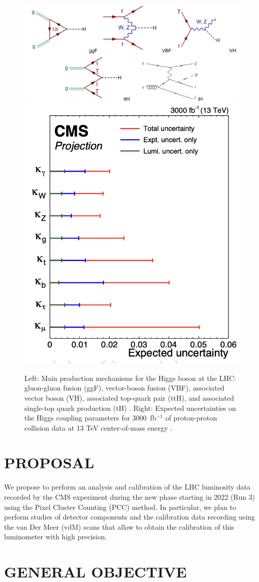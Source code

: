 \documentclass[final,12pt]{article}
\newcommand{\lumi}[1]{{#1~fb$^{-1}$}}
\begin{document}
 \begin{figure}[H]
   \centering
   \includegraphics[width=0.7\columnwidth]{./pg.png}
   \includegraphics[width=0.29\columnwidth]{./higgs_couplings.png}
   \caption{
     Left: Main production mechanisms for the Higgs boson at the LHC: gluon-gluon fusion (ggF), vector-boson fusion (VBF), associated vector boson (VH), associated top-quark pair (ttH), and  associated single-top quark production (tH)  \cite{Grojean:2017hsb-corr}  \cite{Khachatryan:2015ota} .
     Right: Expected uncertainties on the Higgs coupling parameters for  \lumi{3000} of proton-proton collision data at 13 TeV center-of-mass energy \cite{Cepeda:2019klc-corr}.
   }
   \label{figureKappasUncs}
 \end{figure}




\section{PROPOSAL}

We propose to perform an analysis and calibration of the LHC luminosity data recorded by the CMS experiment during the new phase starting in 2022 (Run 3) using the Pixel Cluster Counting (PCC) method.
In particular, we plan to perform studies of detector components and the calibration data recording using the van Der Meer (vdM) scans that allow to obtain the calibration of this luminometer with high precision.

\section{GENERAL OBJECTIVE}
\end{document}
